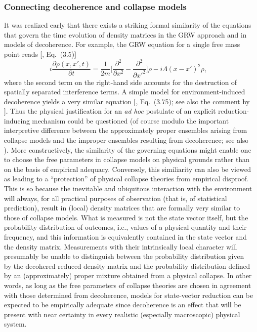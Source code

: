 \documentclass[rmp,aps,amsmath,amsfonts,noshowkeys,noshowpacs,12pt]{revtex4}
\begin{document}
\subsubsection{Connecting decoherence and collapse models} 

It was realized early that there exists a striking formal similarity
of the equations that govern the time evolution of density matrices in
the GRW approach and in models of decoherence. For example, the GRW
equation for a single free mass point reads
[\citealp{Ghirardi:1986:ud}, Eq.~(3.5)]
%
\begin{equation} 
i \frac{\partial
  \rho(x,x',t)}{\partial t} = \frac{1}{2m} \bigg[
\frac{\partial^2}{\partial x^2} - \frac{\partial^2}{\partial x'^2}
\bigg] \rho - i \Lambda (x-x')^2 \rho, 
\end{equation}
%
where the second term on the right-hand side accounts for the
destruction of spatially separated interference terms. A simple model
for environment-induced decoherence yields a very similar equation
[\citealp{Joos:1985:iu}, Eq.~(3.75); see also the comment by
\citealp{Joos:1987:yu}]. Thus the physical justification for an
\emph{ad hoc} postulate of an explicit reduction-inducing mechanism
could be questioned (of course modulo the important interpretive
difference between the approximately proper ensembles arising from
collapse models and the improper ensembles resulting from decoherence;
see also \citealp{Ghirardi:1987:po}). More constructively, the
similarity of the governing equations might enable one to choose the
free parameters in collapse models on physical grounds rather than on
the basis of empirical adequacy.  Conversely, this similiarity can
also be viewed as leading to a ``protection'' of physical collapse
theories from empirical disproof.  This is so because the inevitable
and ubiquitous interaction with the environment will always, for all
practical purposes of observation (that is, of statistical
prediction), result in (local) density matrices that are formally very
similar to those of collapse models. What is measured is not the state
vector itself, but the probability distribution of outcomes, i.e.,
values of a physical quantity and their frequency, and this
information is equivalently contained in the state vector and the
density matrix.  Measurements with their intrinsically local character
will presumably be unable to distinguish between the probability
distribution given by the decohered reduced density matrix and the
probability distribution defined by an (approximately) proper mixture
obtained from a physical collapse. In other words, as long as the free
parameters of collapse theories are chosen in agreement with those
determined from decoherence, models for state-vector reduction can be
expected to be empirically adequate since decoherence is an effect
that will be present with near certainty in every realistic
(especially macroscopic) physical system.
\end{document}
